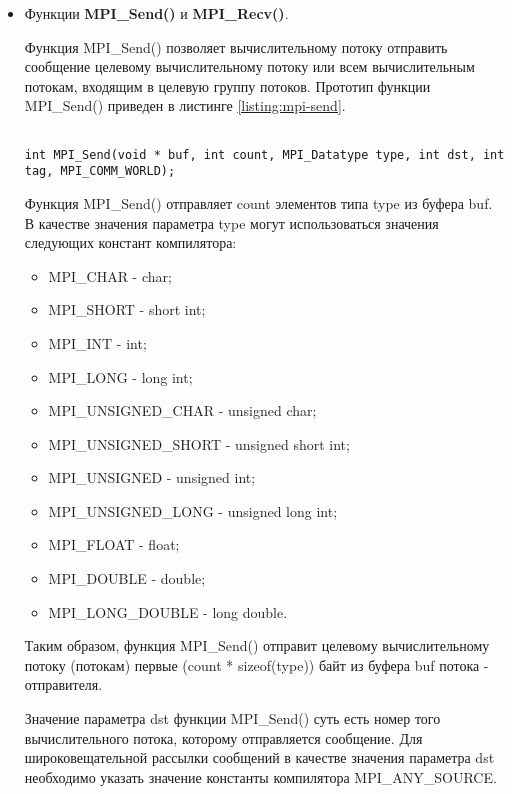\begin{itemize}

	\item Функции {\bf MPI\_Send()} и {\bf MPI\_Recv()}.

	Функция MPI\_Send() позволяет вычислительному потоку отправить сообщение целевому вычислительному потоку или всем вычислительным потокам, входящим в целевую группу потоков. Прототип функции MPI\_Send() приведен в листинге \ref{listing:mpi-send}.

\begin{lstlisting}

int MPI_Send(void * buf, int count, MPI_Datatype type, int dst, int tag, MPI_COMM_WORLD);

\end{lstlisting}
\mylistingend

	Функция MPI\_Send() отправляет count элементов типа type из буфера buf. В качестве значения параметра type могут использоваться значения следующих констант компилятора:

	\begin{itemize}

		\item MPI\_CHAR - char;
		\item MPI\_SHORT - short int;
		\item MPI\_INT - int;
		\item MPI\_LONG - long int;
		\item MPI\_UNSIGNED\_CHAR - unsigned char;
		\item MPI\_UNSIGNED\_SHORT - unsigned short int;
		\item MPI\_UNSIGNED - unsigned int;
		\item MPI\_UNSIGNED\_LONG - unsigned long int;
		\item MPI\_FLOAT - float;
		\item MPI\_DOUBLE - double;
		\item MPI\_LONG\_DOUBLE - long double.

	\end{itemize}

	Таким образом, функция MPI\_Send() отправит целевому вычислительному потоку (потокам) первые (count * sizeof(type)) байт из буфера buf потока - отправителя.

	Значение параметра dst функции MPI\_Send() суть есть номер того вычислительного потока, которому отправляется сообщение. Для широковещательной рассылки сообщений в качестве значения параметра dst необходимо указать значение константы компилятора MPI\_ANY\_SOURCE.


\end{itemize}
